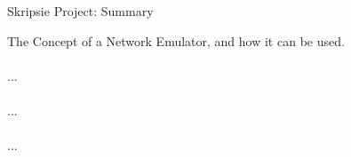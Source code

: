 \begin{Summary}{Skripsie Project: Summary}
\begin{SumTable}
    The Concept of a Network Emulator, and how it can be used.\\

 \hline%
 \\
 \hline%
    ...\\

 \hline%
 \\
 \hline%
    ...\\


 \hline%
 \\
 \hline%
    ...\\


 \hline%
\end{SumTable}


\vspace{1.5cm}
\SumSignatures

\end{Summary}

\endinput
